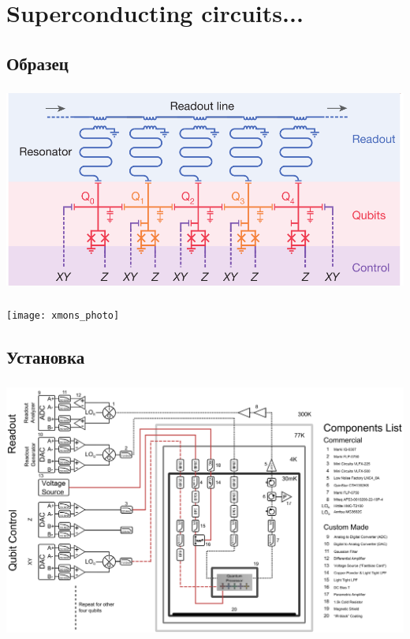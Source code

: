 \documentclass[aspectratio=169, 13pt, t]{beamer}
\begin{document}
\section{Superconducting circuits...}
\subsection{Образец}
\begin{frame}[c]\frametitle{\secname}\framesubtitle{\subsecname}
\centering
\includegraphics[height=0.8\textheight]{scheme}
\end{frame}

\begin{frame}[c]\frametitle{\secname}\framesubtitle{\subsecname}
\centering
\texttt{[image: xmons\_photo]}
\end{frame}

\subsection{Установка}
\begin{frame}[c]\frametitle{\secname}\framesubtitle{\subsecname}
\centering
\includegraphics[height=0.85\textheight]{cryo}
\end{frame}
\end{document}
